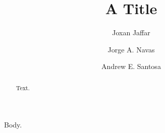 \documentclass{llncs}
\begin{document}
\title{A Title}
\author{Joxan Jaffar \and Jorge A. Navas \and Andrew E. Santosa}
\maketitle
\begin{abstract}Text.\end{abstract}
Body.
\end{document}
